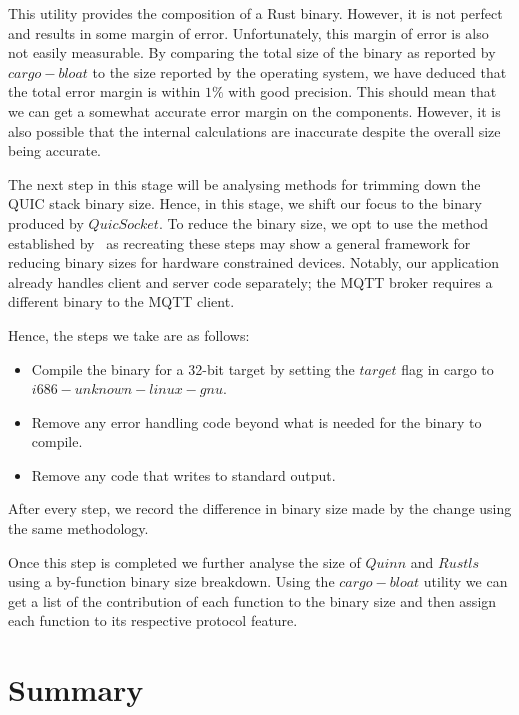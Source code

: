This utility provides the composition of a Rust binary. 
However, it is not perfect and results in some margin of error.
Unfortunately, this margin of error is also not easily measurable.
By comparing the total size of the binary as reported by $cargo-bloat$ to the size reported by the operating system, we have deduced that the total error margin is within $1\%$ with good precision.
This should mean that we can get a somewhat accurate error margin on the components. 
However, it is also possible that the internal calculations are inaccurate despite the overall size being accurate.

The next step in this stage will be analysing methods for trimming down the QUIC stack binary size.
Hence, in this stage, we shift our focus to the binary produced by $QuicSocket$.
To reduce the binary size, we opt to use the method established by~\citet{eggert_towards_2020} as recreating these steps may show a general framework for reducing binary sizes for hardware constrained devices.
Notably, our application already handles client and server code separately; the MQTT broker requires a different binary to the MQTT client.

Hence, the steps we take are as follows:

\begin{itemize}
    \item Compile the binary for a 32-bit target by setting the $target$ flag in cargo to $i686-unknown-linux-gnu$.
    \item Remove any error handling code beyond what is needed for the binary to compile.
    \item Remove any code that writes to standard output.
\end{itemize}

After every step, we record the difference in binary size made by the change using the same methodology.

Once this step is completed we further analyse the size of $Quinn$ and $Rustls$ using a by-function binary size breakdown.
Using the $cargo-bloat$ utility we can get a list of the contribution of each function to the binary size and then assign each function to its respective protocol feature.



\section{Summary}

